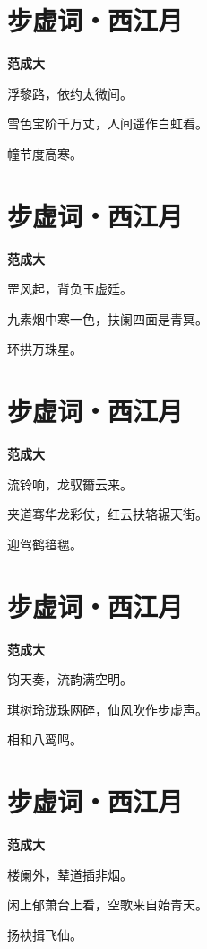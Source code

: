 \documentclass[12pt,a4paper]{ctexbook}
\begin{document}
\section{步虚词・西江月}
\textbf{范成大}\par\vspace{0.5em}
浮黎路，依约太微间。\par
雪色宝阶千万丈，人间遥作白虹看。\par
幢节度高寒。\par

\section{步虚词・西江月}
\textbf{范成大}\par\vspace{0.5em}
罡风起，背负玉虚廷。\par
九素烟中寒一色，扶阑四面是青冥。\par
环拱万珠星。\par

\section{步虚词・西江月}
\textbf{范成大}\par\vspace{0.5em}
流铃响，龙驭籋云来。\par
夹道骞华龙彩仗，红云扶辂辗天街。\par
迎驾鹤毰毸。\par

\section{步虚词・西江月}
\textbf{范成大}\par\vspace{0.5em}
钧天奏，流韵满空明。\par
琪树玲珑珠网碎，仙风吹作步虚声。\par
相和八鸾鸣。\par

\section{步虚词・西江月}
\textbf{范成大}\par\vspace{0.5em}
楼阑外，辇道插非烟。\par
闲上郁萧台上看，空歌来自始青天。\par
扬袂揖飞仙。\par
\end{document}
